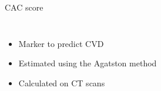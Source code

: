 \documentclass[compress,aspectratio=169,xcolor=table]{beamer}
\begin{document}
\begin{frame}{CAC score}
	\begin{columns}[onlytextwidth]
			\begin{itemize}
				\item Marker to predict CVD
				\item Estimated using the Agatston method\footnotemark
				\item Calculated on CT scans
			\end{itemize}
			\begin{figure}
				\centering
				\begin{subfigure}[b]{0.25\textwidth}
				\end{subfigure}\hspace{0.5em}
				\begin{subfigure}[b]{0.25\textwidth}

\end{subfigure}
\end{figure}
\end{columns}
\end{frame}
\end{document}
